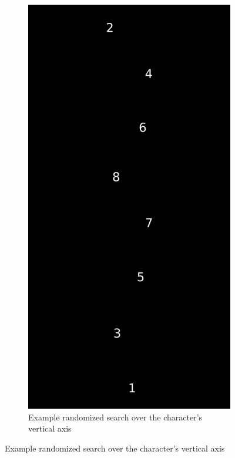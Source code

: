\documentclass[11pt]{article}
\begin{document}
\begin{figure}[htb]
  \centering
  \begin{subfigure}[htb]{0.33\textwidth}
    \includegraphics[width=\textwidth]{resources/height_search}
    \caption{Example randomized search over the character's vertical axis}

\end{subfigure}
\end{figure}
\end{document}
